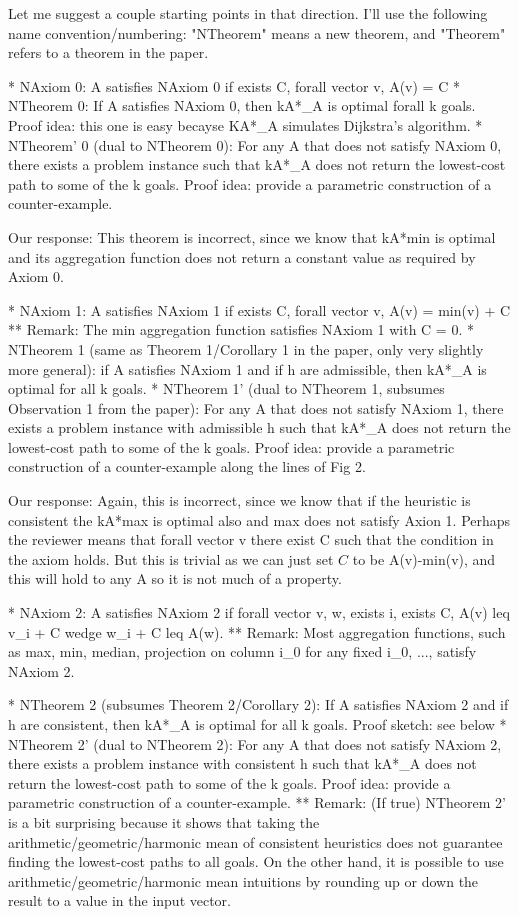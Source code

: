 Let me suggest a couple starting points in that direction. I'll use
the following name convention/numbering: "NTheorem" means a
new theorem, and "Theorem" refers to a theorem in the
paper.

* NAxiom 0: A satisfies NAxiom 0 if exists C, forall vector v, A(v) =
C 
* NTheorem 0: If A satisfies NAxiom 0, then kA*_A is optimal forall k
goals.
Proof idea: this one is easy becayse KA*_A simulates Dijkstra's
algorithm.
* NTheorem' 0 (dual to NTheorem 0): For any A that does not satisfy
NAxiom 0, there exists a problem instance such that kA*_A does not
return the lowest-cost path to some of the k goals.
Proof idea: provide a parametric construction of a counter-example.

Our response: This theorem is incorrect, since we know that kA*min is optimal
and its aggregation function does not return a constant value as required by Axiom 0. 

* NAxiom 1: A satisfies NAxiom 1 if exists C, forall vector v, A(v) =
min(v) + C
** Remark: The min aggregation function satisfies NAxiom 1 with C =
0.
* NTheorem 1 (same as Theorem 1/Corollary 1 in the paper, only very
slightly more general): if A satisfies NAxiom 1 and if h are
admissible, then kA*_A is optimal for all k goals.
* NTheorem 1' (dual to NTheorem 1, subsumes Observation 1 from the
paper): For any A that does not satisfy NAxiom 1, there exists a
problem instance with admissible h such that kA*_A does not return the
lowest-cost path to some of the k goals.
Proof idea: provide a parametric construction of a counter-example
along the lines of Fig 2.

Our response: Again, this is incorrect, since we know that if the heuristic is consistent the kA*max is optimal also
and max does not satisfy Axion 1. Perhaps the reviewer means that forall vector v there exist C such that the condition in the axiom holds.
But this is trivial as we can just set $C$ to be A(v)-min(v), and this will hold to any A so it is not much of a property. 

* NAxiom 2: A satisfies NAxiom 2 if forall vector v, w, exists i,
exists C, A(v) leq v_i + C wedge w_i + C leq A(w).
** Remark: Most aggregation functions, such as max, min, median,
projection on column i_0 for any fixed i_0, ..., satisfy NAxiom 2.


* NTheorem 2 (subsumes Theorem 2/Corollary 2): If A satisfies NAxiom 2
and if h are consistent, then kA*_A is optimal for all k goals.
Proof sketch: see below
* NTheorem 2' (dual  to NTheorem 2): For any A that does not satisfy
NAxiom 2, there exists a problem instance with consistent h such that
kA*_A does not return the lowest-cost path to some of the k goals.
Proof idea: provide a parametric construction of a counter-example.
** Remark: (If true) NTheorem 2' is a bit surprising because it shows
that taking the arithmetic/geometric/harmonic mean of consistent
heuristics does not guarantee finding the lowest-cost paths to all
goals. On the other hand, it is possible to use
arithmetic/geometric/harmonic mean intuitions by rounding up or down
the result to a value in the input vector.


